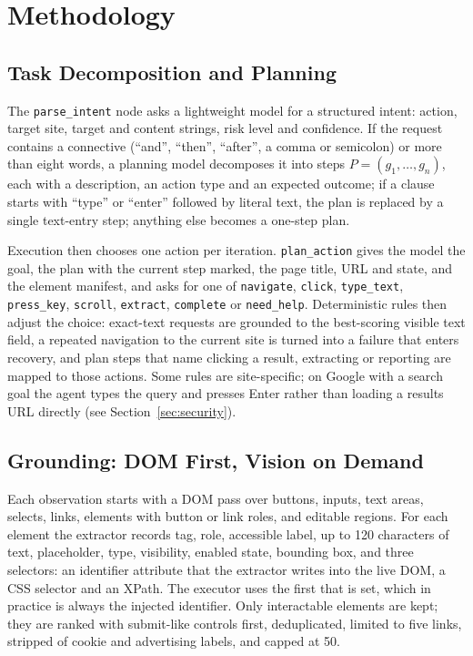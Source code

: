 \section{Methodology}
\label{sec:method}

\subsection{Task Decomposition and Planning}
\label{sec:planning}

The \texttt{parse\_intent} node asks a lightweight model for a structured intent: action, target site, target and content strings, risk level and confidence. If the request contains a connective (``and'', ``then'', ``after'', a comma or semicolon) or more than eight words, a planning model decomposes it into steps $P=(g_1,\dots,g_n)$, each with a description, an action type and an expected outcome; if a clause starts with ``type'' or ``enter'' followed by literal text, the plan is replaced by a single text-entry step; anything else becomes a one-step plan.

Execution then chooses one action per iteration. \texttt{plan\_action} gives the model the goal, the plan with the current step marked, the page title, URL and state, and the element manifest, and asks for one of \texttt{navigate}, \texttt{click}, \texttt{type\_text}, \texttt{press\_key}, \texttt{scroll}, \texttt{extract}, \texttt{complete} or \texttt{need\_help}. Deterministic rules then adjust the choice: exact-text requests are grounded to the best-scoring visible text field, a repeated navigation to the current site is turned into a failure that enters recovery, and plan steps that name clicking a result, extracting or reporting are mapped to those actions. Some rules are site-specific; on Google with a search goal the agent types the query and presses Enter rather than loading a results URL directly (see Section~\ref{sec:security}).

\subsection{Grounding: DOM First, Vision on Demand}
\label{sec:grounding}

Each observation starts with a DOM pass over buttons, inputs, text areas, selects, links, elements with button or link roles, and editable regions. For each element the extractor records tag, role, accessible label, up to 120 characters of text, placeholder, type, visibility, enabled state, bounding box, and three selectors: an identifier attribute that the extractor writes into the live DOM, a CSS selector and an XPath. The executor uses the first that is set, which in practice is always the injected identifier. Only interactable elements are kept; they are ranked with submit-like controls first, deduplicated, limited to five links, stripped of cookie and advertising labels, and capped at 50.

